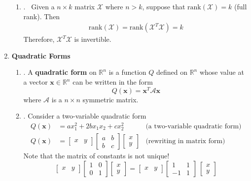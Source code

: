 \documentclass[12pt]{article}
\begin{document}
\begin{enumerate}
\begin{enumerate}
	\item\underline{}. \ Given a $n \times k$ matrix $\mathcal{X}$ where $n>k$, suppose that $\text{rank}(\mathcal{X})=k$ (full rank). Then 
	\begin{align*}
		\text{rank}(\mathcal{X}) = \text{rank}(\mathcal{X}^T\mathcal{X}) = k
	\end{align*}
	Therefore, $\mathcal{X}^T \mathcal{X}$ is invertible. 
	
	\end{enumerate}

\newpage 

\item\textbf{Quadratic Forms}	
\begin{enumerate}
	
	\item\underline{}.
	A \textbf{quadratic form} on $\mathbb{R}^n$ is a function $Q$ defined on $\mathbb{R}^n$ whose value at a vector
	$\mathbf{x}\in\mathbb{R}^n$ can be written in the form
	\[Q(\mathbf{x})=\mathbf{x}^T\mathcal{A}\mathbf{x}\]
	where $\mathcal{A}$ is a $n\times n$ symmetric matrix.

	\item\underline{}.
	Consider a two-variable quadratic form
	\begin{align*}
	Q(\mathbf{x}) & = a x_1^2 + 2b x_1x_2 + c x_2^2
	&\text{(a two-variable quadratic form)}\\[5pt]
	Q(\mathbf{x}) & = \begin{bmatrix}x & y\end{bmatrix}\begin{bmatrix} a & b \\ b & c\end{bmatrix} \begin{bmatrix}x \\ y\end{bmatrix}
	&\text{(rewriting in matrix form)}
	\end{align*}
	Note that the matrix of constants is not unique!
	\[\begin{bmatrix}x & y\end{bmatrix}\begin{bmatrix} 1 & 0 \\ 0 & 1\end{bmatrix} \begin{bmatrix}x \\ y\end{bmatrix}
	= \begin{bmatrix}x & y\end{bmatrix}\begin{bmatrix} 1 & 1 \\ -1 & 1\end{bmatrix}\
	\begin{bmatrix}x \\ y\end{bmatrix}\]
	

\end{enumerate}
\end{enumerate}
\end{document}
